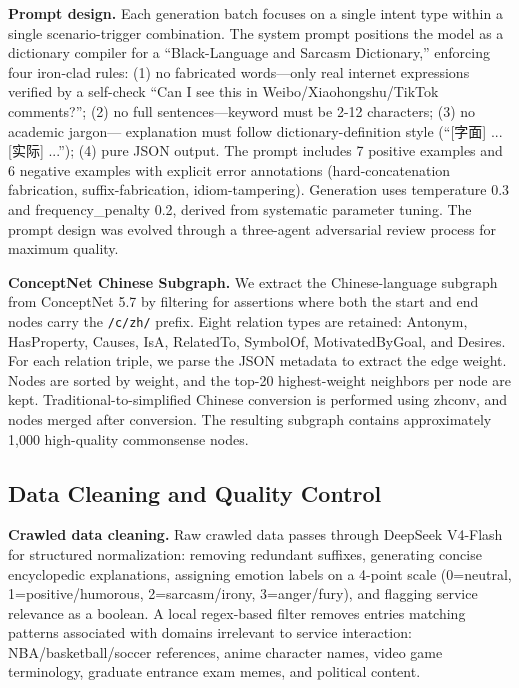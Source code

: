 \documentclass[conference]{IEEEtran}
\begin{document}
\textbf{Prompt design.}
Each generation batch focuses on a single intent type within a single
scenario-trigger combination. The system prompt positions the model as a
dictionary compiler for a ``Black-Language and Sarcasm Dictionary,'' enforcing
four iron-clad rules: (1) no fabricated words—only real internet expressions
verified by a self-check ``Can I see this in Weibo/Xiaohongshu/TikTok comments?'';
(2) no full sentences—keyword must be 2-12 characters; (3) no academic jargon—
explanation must follow dictionary-definition style (``{[}字面{]} ... {[}实际{]} ...'');
(4) pure JSON output. The prompt includes 7 positive examples and 6 negative
examples with explicit error annotations (hard-concatenation fabrication,
suffix-fabrication, idiom-tampering). Generation uses temperature 0.3 and
frequency\_penalty 0.2, derived from systematic parameter tuning. The prompt
design was evolved through a three-agent adversarial review process for maximum
quality.

\textbf{ConceptNet Chinese Subgraph.}
We extract the Chinese-language subgraph from ConceptNet 5.7 by filtering for
assertions where both the start and end nodes carry the \texttt{/c/zh/} prefix.
Eight relation types are retained: Antonym, HasProperty, Causes, IsA, RelatedTo,
SymbolOf, MotivatedByGoal, and Desires. For each relation triple, we parse the
JSON metadata to extract the edge weight. Nodes are sorted by weight, and the
top-20 highest-weight neighbors per node are kept. Traditional-to-simplified
Chinese conversion is performed using zhconv, and nodes merged after conversion.
The resulting subgraph contains approximately 1,000 high-quality commonsense nodes.

\subsection{Data Cleaning and Quality Control}

\textbf{Crawled data cleaning.}
Raw crawled data passes through DeepSeek V4-Flash for structured normalization:
removing redundant suffixes, generating concise encyclopedic explanations,
assigning emotion labels on a 4-point scale (0=neutral, 1=positive/humorous,
2=sarcasm/irony, 3=anger/fury), and flagging service relevance as a boolean.
A local regex-based filter removes entries matching patterns associated with
domains irrelevant to service interaction: NBA/basketball/soccer references,
anime character names, video game terminology, graduate entrance exam memes,
and political content.
\end{document}
